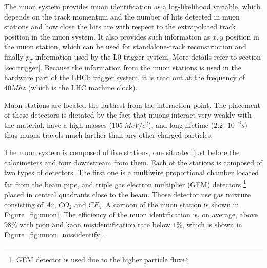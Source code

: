 The muon system provides muon identification as a log-likelihood variable, which depends on the track momentum and the number of hits detected in muon stations and how close the hits are with respect to the extrapolated track position in the muon system. It also provides such information as $x,y$ position in the muon station, which can be used for standalone-track reconstruction and finally $p_T$ information used by the L0 trigger system. More details refer to section \ref{sec:trigger}. Because the information from the muon stations is used in the hardware part of the LHCb trigger system, it is read out at the frequency of $40 Mhz$ (which is the LHC machine clock). 

Muon stations are located the farthest from the interaction point. The placement of these detectors is dictated by the fact that muons interact very weakly with the material, have a high masses ($105~ MeV/c^2$), and long lifetime ($2.2 \cdot 10^{-6}s$) thus muons travels much farther than any other charged particles.  
  
The muon system is composed of five stations, one situated just before the calorimeters and four downstream from them. Each of the stations is composed of two types of detectors. The first one is a multiwire proportional chamber located far from the beam pipe, and triple gas electron multiplier (GEM) detectors \footnote{GEM detector is used due to the higher particle flux} placed in central quadrants close to the beam. Those detector use gas mixture consisting of $Ar$, $CO_2$ and $CF_4$. A cartoon of the muon station is shown in Figure~\ref{fig:muon}. 
The efficiency of the muon identification is, on average, above $98\%$ with pion and kaon misidentification rate below $1\%$, which is shown in Figure~\ref{fig:muon_missidentify}. 


